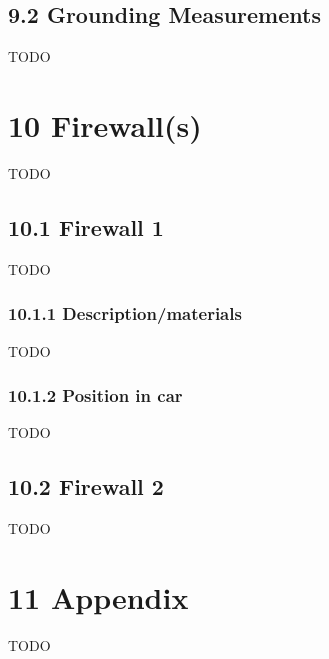 \documentclass{article}
\begin{document}
\subsection*{9.2 Grounding Measurements}
TODO

\section*{10 Firewall(s)}
TODO

\subsection*{10.1 Firewall 1}
TODO

\subsubsection*{10.1.1 Description/materials}
TODO

\subsubsection*{10.1.2 Position in car}
TODO

\subsection*{10.2 Firewall 2}
TODO

\section*{11 Appendix}
TODO
\end{document}
